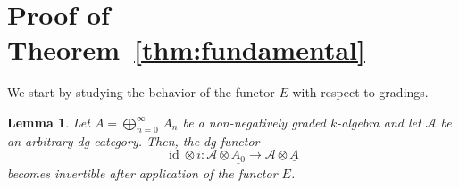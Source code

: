 \documentclass{amsart}
\numberwithin{equation}{subsection}
\newtheorem{lemma}[theorem]{Lemma}
\theoremstyle{remark}
\theoremstyle{remark}
\theoremstyle{remark}
\theoremstyle{remark}
\begin{document}
\section{Proof of Theorem~\ref{thm:fundamental}}\label{sec:proof}
We start by studying the behavior of the functor $E$ with respect to gradings.
\begin{lemma}\label{lem:key1}
Let $A=\bigoplus_{n=0}^\infty\, A_n$ be a non-negatively graded $k$-algebra and let ${{\mathcal A}}$ be an arbitrary dg category. Then, the dg functor 
\begin{equation}\label{eq:inclusion}
\operatorname{id} \otimes i: {{\mathcal A}}\otimes \underline{A_0} \to {{\mathcal A}}\otimes \underline{A}
\end{equation}
becomes invertible after application of the functor $E$. 
\end{lemma}
\end{document}

